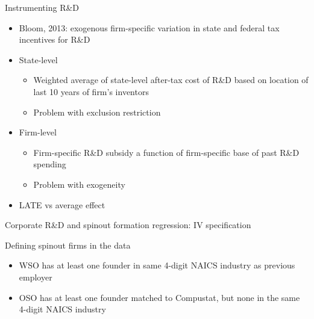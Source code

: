 \documentclass[english,usenames,dvipsnames]{beamer}
\begin{document}
\begin{frame}{Instrumenting R\&D}
\begin{itemize}
	\item Bloom, 2013: exogenous firm-specific variation in state and federal tax incentives for R\&D
	\item State-level
	\begin{itemize}
		\item Weighted average of state-level after-tax cost of R\&D based on location of last 10 years of firm's inventors
		\item Problem with exclusion restriction
	\end{itemize}
	\item Firm-level
	\begin{itemize}
		\item Firm-specific R\&D subsidy a function of firm-specific base of past R\&D spending
		\item Problem with exogeneity
	\end{itemize}
	\item LATE vs average effect
\end{itemize}
\end{frame}

\begin{frame}{Corporate R\&D and spinout formation regression: IV specification}
\begin{table}
\Tiny
\centering

\caption{\tiny The dependent variable is the log of the average yearly number of founders from the parent firm joining startups, over the years $t+1,t+2,t+3$. Independent variables are similarly averaged over $t,t-1,t-2$. Columns (1) and (5) are estimated by OLS. The remaining columns columns are estimated by instrumenting R\&D spending using firm-specific tax incentives for R\&D, from Bloom 2013. Standard errors are clustered at the firm level.}
\label{table:RDandSpinoutFormation_iv_founder2_l3f3}
\end{table}
\end{frame}

\begin{frame}{Defining spinout firms in the data}
\begin{itemize}	
	\item WSO has at least one founder in same 4-digit NAICS industry as previous employer
	\item OSO has at least one founder matched to Compustat, but none in the same 4-digit NAICS industry
\end{itemize}
\end{frame}
\end{document}
